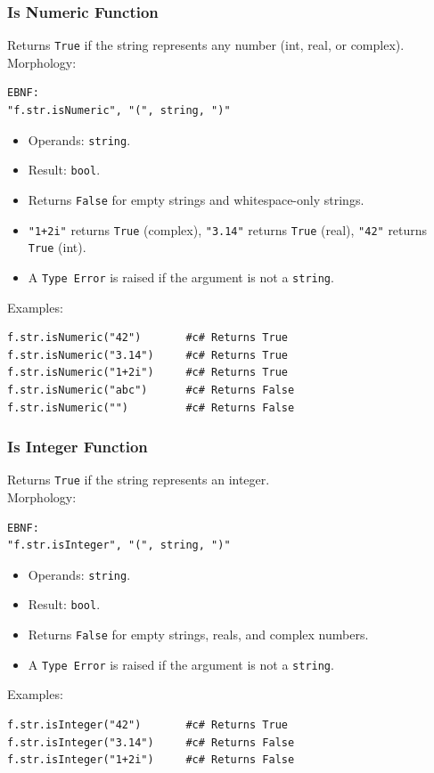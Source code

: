 \subsubsection{Is Numeric Function}
Returns \texttt{True} if the string represents any number (int, real, or complex). \\
Morphology:
\begin{verbatim}
EBNF:
"f.str.isNumeric", "(", string, ")"
\end{verbatim}
\begin{itemize}
\item Operands: \texttt{string}.
\item Result: \texttt{bool}.
\item Returns \texttt{False} for empty strings and whitespace-only strings.
\item \texttt{"1+2i"} returns \texttt{True} (complex), \texttt{"3.14"} returns \texttt{True} (real), \texttt{"42"} returns \texttt{True} (int).
\item A \texttt{Type Error} is raised if the argument is not a \texttt{string}.
\end{itemize}
Examples:
\begin{verbatim}
f.str.isNumeric("42")       #c# Returns True
f.str.isNumeric("3.14")     #c# Returns True
f.str.isNumeric("1+2i")     #c# Returns True
f.str.isNumeric("abc")      #c# Returns False
f.str.isNumeric("")         #c# Returns False
\end{verbatim}

\subsubsection{Is Integer Function}
Returns \texttt{True} if the string represents an integer. \\
Morphology:
\begin{verbatim}
EBNF:
"f.str.isInteger", "(", string, ")"
\end{verbatim}
\begin{itemize}
\item Operands: \texttt{string}.
\item Result: \texttt{bool}.
\item Returns \texttt{False} for empty strings, reals, and complex numbers.
\item A \texttt{Type Error} is raised if the argument is not a \texttt{string}.
\end{itemize}
Examples:
\begin{verbatim}
f.str.isInteger("42")       #c# Returns True
f.str.isInteger("3.14")     #c# Returns False
f.str.isInteger("1+2i")     #c# Returns False
\end{verbatim}

